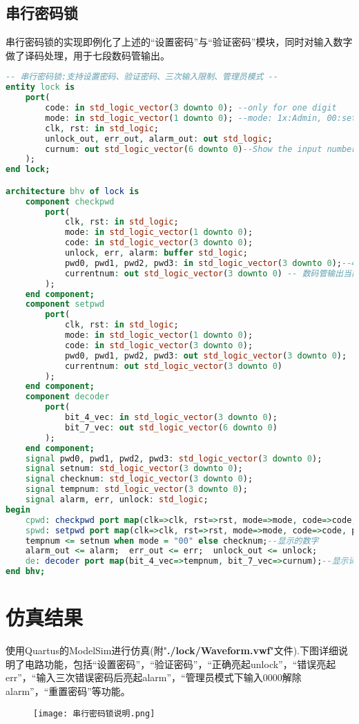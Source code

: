 \documentclass[UTF8, onecolumn, a4paper]{article}
\begin{document}
\subsection{串行密码锁}
串行密码锁的实现即例化了上述的“设置密码”与“验证密码”模块，同时对输入数字做了译码处理，用于七段数码管输出。
\begin{lstlisting}[language={VHDL}, title={lock.vhd}]
-- 串行密码锁:支持设置密码、验证密码、三次输入限制、管理员模式 --
entity lock is
	port(
		code: in std_logic_vector(3 downto 0); --only for one digit
		mode: in std_logic_vector(1 downto 0); --mode: 1x:Admin, 00:set password, 01:check password
		clk, rst: in std_logic;
		unlock_out, err_out, alarm_out: out std_logic; 
		curnum: out std_logic_vector(6 downto 0)--Show the input number, for debug;
	);
end lock;

architecture bhv of lock is
	component checkpwd
		port(
			clk, rst: in std_logic;
			mode: in std_logic_vector(1 downto 0);
			code: in std_logic_vector(3 downto 0);
			unlock, err, alarm: buffer std_logic;
			pwd0, pwd1, pwd2, pwd3: in std_logic_vector(3 downto 0);--4位16进制密码，由setpwd提供
			currentnum: out std_logic_vector(3 downto 0) -- 数码管输出当前数位
		);
	end component;
	component setpwd
		port(
			clk, rst: in std_logic;
			mode: in std_logic_vector(1 downto 0);
			code: in std_logic_vector(3 downto 0);
			pwd0, pwd1, pwd2, pwd3: out std_logic_vector(3 downto 0);
			currentnum: out std_logic_vector(3 downto 0)
		);
	end component;
	component decoder
		port(
			bit_4_vec: in std_logic_vector(3 downto 0);
			bit_7_vec: out std_logic_vector(6 downto 0)
		);
	end component;
	signal pwd0, pwd1, pwd2, pwd3: std_logic_vector(3 downto 0);
	signal setnum: std_logic_vector(3 downto 0);
	signal checknum: std_logic_vector(3 downto 0);
	signal tempnum: std_logic_vector(3 downto 0);
	signal alarm, err, unlock: std_logic;
begin
	cpwd: checkpwd port map(clk=>clk, rst=>rst, mode=>mode, code=>code, unlock=>unlock, err=>err, alarm=>alarm, pwd0=>pwd0, pwd1=>pwd1, pwd2=>pwd2, pwd3=>pwd3, currentnum=>checknum);--验证密码元件例化
	spwd: setpwd port map(clk=>clk, rst=>rst, mode=>mode, code=>code, pwd0=>pwd0, pwd1=>pwd1, pwd2=>pwd2, pwd3=>pwd3, currentnum=>setnum);--设置密码元件例化
	tempnum <= setnum when mode = "00" else checknum;--显示的数字
	alarm_out <= alarm;  err_out <= err;  unlock_out <= unlock;
	de: decoder port map(bit_4_vec=>tempnum, bit_7_vec=>curnum);--显示译码
end bhv;
\end{lstlisting}

\section{仿真结果}
使用Quartus的ModelSim进行仿真(附"\textbf{./lock/Waveform.vwf}"文件).下图详细说明了电路功能，包括“设置密码”，“验证密码”，“正确亮起unlock”，“错误亮起err”，“输入三次错误密码后亮起alarm”，“管理员模式下输入0000解除alarm”，“重置密码”等功能。
\begin{figure}[htb]
	\centering
	\texttt{[image: 串行密码锁说明.png]}
\end{figure}
\end{document}
